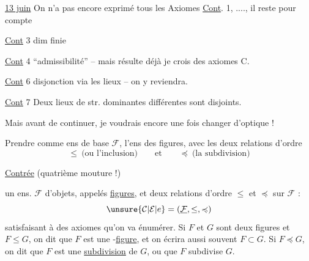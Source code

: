 
\uline{13 juin} On n'a pas encore exprimé tous les Axiomes \uline{Cont}. 1, ...., il reste pour compte

\uline{Cont} 3 dim finie

\uline{Cont} 4 ``admissibilité'' -- mais résulte déjà je crois des axiomes C.

\uline{Cont} 6  disjonction via les lieux -- on y reviendra.

\uline{Cont} 7 Deux lieux de str. dominantes différentes sont disjoints.

Mais avant de continuer, je voudrais encore une fois changer d'optique !

Prendre comme ens de base $\mathcal F$, l'ens des figures, avec les deux relations d'ordre \[ \leq\ \text{(ou l'inclusion)} \qquad \text{et}\qquad \preccurlyeq\ \text{(la subdivision)} \]

\uline{Contrée} (quatrième mouture !)

 un ens. $\mathcal F$ d'objets, appelés \uline{figures}, et deux relations d'ordre $\leq$ et $\preccurlyeq$ sur $\mathcal F$ : \[ \unsure{\mathcal C|\mathcal E|e}=(\underline{\mathcal F},\leq,\preccurlyeq) \] satisfaisant à des axiomes\unsure{,|{}} qu'on va énumérer. Si $F$ et $G$ sont deux figures et $F\leq G$, on dit que $F$ est une -\uline{figure}, et on écrira aussi souvent $F\subset G$. Si $F\preccurlyeq G$, on dit que $F$ est une \uline{subdivision} de $G$, ou que $F$ subdivise $G$.
